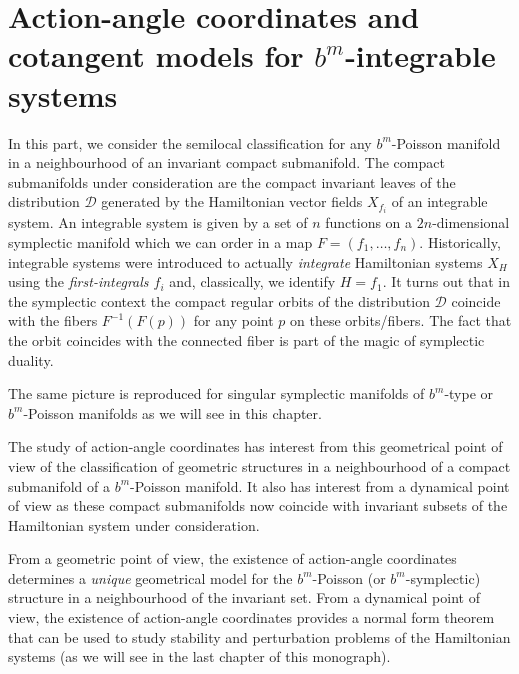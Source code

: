 %
%
%

\part[Action-angle coordinates and cotangent models]{Action-angle coordinates and cotangent models for $b^m$-integrable systems}


In this part,  we consider the semilocal classification for any $b^m$-Poisson manifold in a neighbourhood of an invariant compact submanifold.
The compact submanifolds under consideration are the compact invariant leaves of the distribution $\mathcal D$ generated by the Hamiltonian vector fields $X_{f_i}$ of an integrable system. An integrable system is given by a set of $n$ functions on a $2n$-dimensional symplectic manifold  which we can order in a map $F=(f_1, \dots, f_n)$. Historically, integrable systems were introduced to actually \emph{integrate} Hamiltonian systems $X_H$ using the \emph{first-integrals $f_i$} and, classically, we identify $H=f_1$. It turns out that in the symplectic context the compact regular orbits of the distribution $\mathcal D$ coincide with the fibers $F^{-1}(F(p))$ for any point $p$ on these orbits/fibers.
The fact that the orbit coincides with the connected fiber is part of the magic of symplectic duality.

The same picture is reproduced for singular symplectic manifolds of $b^m$-type or $b^m$-Poisson manifolds as we will see in this chapter.


The study of action-angle coordinates has interest from this geometrical point of view of the classification of geometric structures in a neighbourhood of a compact submanifold of a $b^m$-Poisson manifold. It also has interest from a dynamical point of view as these compact submanifolds now coincide with invariant subsets of the Hamiltonian system under consideration.

From a geometric point of view, the existence of action-angle coordinates determines a \emph{unique} geometrical model for the $b^m$-Poisson (or $b^m$-symplectic) structure in a neighbourhood of the invariant set. From a dynamical point of view, the existence of action-angle coordinates provides a normal form theorem that can be used to study stability and perturbation problems of the Hamiltonian systems (as we will see in the last chapter of this monograph).

